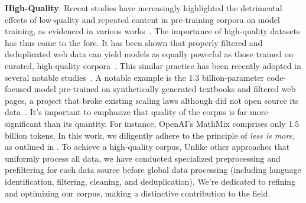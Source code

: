 \textbf{High-Quality}. Recent studies have increasingly highlighted the detrimental effects of low-quality and repeated content in pre-training corpora on model training, as evidenced in various works~\citep{10.1145/3359591.3359735-code-duplication,luccioni-viviano-2021-whats,lee-etal-2022-deduplicating,DBLP:journals/corr/abs-2205-10487-scaling-law-for-training-on-repeated-data,DBLP:journals/corr/abs-2305-13169-a-pretrainer-data-guide}. The importance of high-quality datasets has thus come to the fore. It has been shown that properly filtered and deduplicated web data can yield models as equally powerful as those trained on curated, high-quality corpora~\citep{DBLP:journals/corr/abs-2306-01116-refinedweb}. This similar practice has been recently adopted in several notable studies~\citep{SlimPajama,allenai-dolma,RedPajama-v2}. A notable example is the 1.3 billion-parameter code-focused model pre-trained on synthetically generated textbooks and filtered web pages, a project that broke existing scaling laws although did not open source its data~\citep{DBLP:journals/corr/abs-2306-11644-textbooks-are-all-you-need}. It's important to emphasize that quality of the corpus is far more significant than its quantity. For instance, OpenAI's MathMix comprises only 1.5 billion tokens. In this work, we diligently adhere to the principle of \emph{less is more}, as outlined in \citet{DBLP:journals/corr/abs-2305-11206-lima}. To achieve a high-quality corpus, Unlike other approaches that uniformly process all data, we have conducted specialized preprocessing and prefiltering for each data source before global data processing (including language identification, filtering, cleaning, and deduplication). We're dedicated to refining and optimizing our corpus, making a distinctive contribution to the field.

